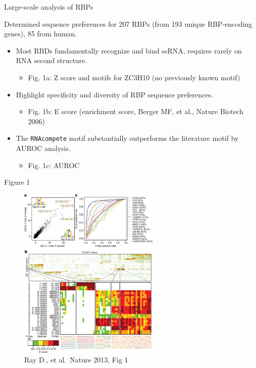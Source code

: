 \documentclass[professionalfont, 12pt, default]{beamer}
\providecommand{\tightlist}{%
    \setlength{\itemsep}{0pt}\setlength{\parskip}{0pt}}
\begin{document}
\begin{frame}[fragile]{%
\protect\hypertarget{large-scale-analysis-of-rbps}{%
Large-scale analysis of RBPs}}

Determined sequence preferences for 207 RBPs (from 193 unique
RBP-encoding genes), 85 from human.

\begin{itemize}
\tightlist
\item
  Most RBDs fundamentally recognize and bind ssRNA, requires rarely on
  RNA second structure.

  \begin{itemize}
  \tightlist
  \item
    Fig. 1a: Z score and motifs for ZC3H10 (no previously known motif)
  \end{itemize}
\item
  Highlight specificity and diversity of RBP sequence preferences.

  \begin{itemize}
  \tightlist
  \item
    Fig. 1b: E score (enrichment score, Berger MF, et al., Nature
    Biotech 2006)
  \end{itemize}
\item
  The \texttt{RNAcompete} motif substantially outperforms the literature
  motif by AUROC analysis.

  \begin{itemize}
  \tightlist
  \item
    Fig. 1c: AUROC
  \end{itemize}
\end{itemize}

\end{frame}

\begin{frame}{%
\protect\hypertarget{figure-1}{%
Figure 1}}

\begin{figure}
\centering
\includegraphics[width=0.6\textwidth,height=\textheight]{img/f1.jpg}
\caption{Ray D., et al.~Nature 2013, Fig 1}
\end{figure}

\end{frame}
\end{document}
